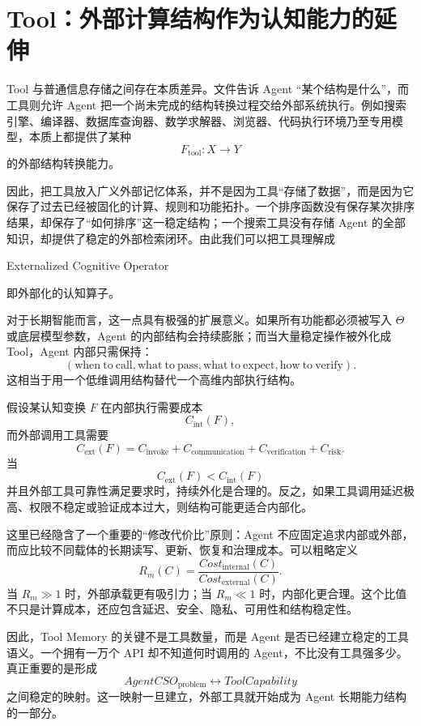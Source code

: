 \section{Tool：外部计算结构作为认知能力的延伸}

Tool 与普通信息存储之间存在本质差异。文件告诉 Agent ``某个结构是什么''，而工具则允许 Agent 把一个尚未完成的结构转换过程交给外部系统执行。例如搜索引擎、编译器、数据库查询器、数学求解器、浏览器、代码执行环境乃至专用模型，本质上都提供了某种
\[
F_{\mathrm{tool}}:X\rightarrow Y
\]
的外部结构转换能力。

因此，把工具放入广义外部记忆体系，并不是因为工具``存储了数据''，而是因为它保存了过去已经被固化的计算、规则和功能拓扑。一个排序函数没有保存某次排序结果，却保存了``如何排序''这一稳定结构；一个搜索工具没有存储 Agent 的全部知识，却提供了稳定的外部检索闭环。由此我们可以把工具理解成
\begin{statementbox}
Externalized Cognitive Operator
\end{statementbox}
即外部化的认知算子。

对于长期智能而言，这一点具有极强的扩展意义。如果所有功能都必须被写入 \(\Theta\) 或底层模型参数，Agent 的内部结构会持续膨胀；而当大量稳定操作被外化成 Tool，Agent 内部只需保持：
\[
(\mathrm{when\ to\ call},
\mathrm{what\ to\ pass},
\mathrm{what\ to\ expect},
\mathrm{how\ to\ verify}).
\]
这相当于用一个低维调用结构替代一个高维内部执行结构。

假设某认知变换 \(F\) 在内部执行需要成本
\[
C_{\mathrm{int}}(F),
\]
而外部调用工具需要
\[
C_{\mathrm{ext}}(F)
=
C_{\mathrm{invoke}}
+
C_{\mathrm{communication}}
+
C_{\mathrm{verification}}
+
C_{\mathrm{risk}}.
\]
当
\[
C_{\mathrm{ext}}(F)<C_{\mathrm{int}}(F)
\]
并且外部工具可靠性满足要求时，持续外化是合理的。反之，如果工具调用延迟极高、权限不稳定或验证成本过大，则结构可能更适合内部化。

这里已经隐含了一个重要的``修改代价比''原则：Agent 不应固定追求内部或外部，而应比较不同载体的长期读写、更新、恢复和治理成本。可以粗略定义
\[
R_m(C)
=
\frac{
Cost_{\mathrm{internal}}(C)
}{
Cost_{\mathrm{external}}(C)
}.
\]
当 \(R_m\gg1\) 时，外部承载更有吸引力；当 \(R_m\ll1\) 时，内部化更合理。这个比值不只是计算成本，还应包含延迟、安全、隐私、可用性和结构稳定性。

因此，Tool Memory 的关键不是工具数量，而是 Agent 是否已经建立稳定的工具语义。一个拥有一万个 API 却不知道何时调用的 Agent，不比没有工具强多少。真正重要的是形成
\[
AgentCSO_{\mathrm{problem}}
\leftrightarrow
ToolCapability
\]
之间稳定的映射。这一映射一旦建立，外部工具就开始成为 Agent 长期能力结构的一部分。

